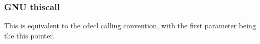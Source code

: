 \subsubsection{GNU thiscall}

This is equivalent to the cdecl calling convention, with the first parameter being the this pointer.

% 
% 
% 
% 
% 
% 
